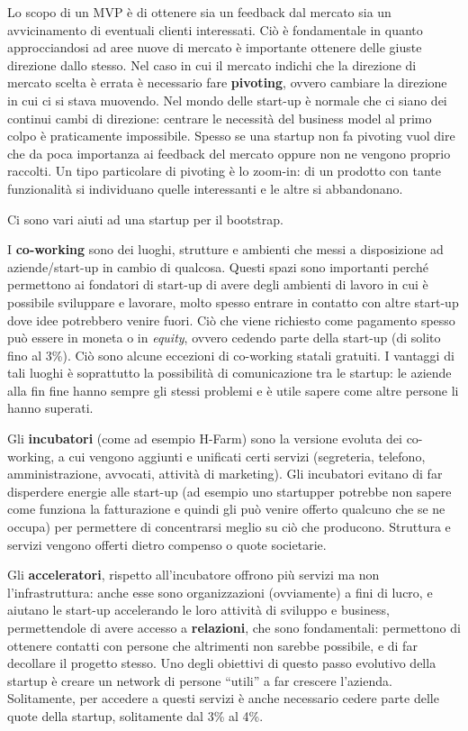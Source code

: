 \begin{enumerate}
 Lo scopo di un MVP è di ottenere sia un feedback dal mercato sia
 un avvicinamento di eventuali clienti interessati. Ciò è fondamentale in
 quanto approcciandosi ad aree nuove di mercato è importante ottenere delle
 giuste direzione dallo stesso. Nel caso in cui il mercato indichi che la
 direzione di mercato scelta è errata è necessario fare \textbf{pivoting},
 ovvero cambiare la direzione in cui ci si stava muovendo. Nel mondo delle
 start-up è normale che ci siano dei continui cambi di direzione: centrare le
 necessità del business model al primo colpo è praticamente impossibile. Spesso
 se una startup non fa pivoting vuol dire che da poca importanza ai feedback
 del mercato oppure non ne vengono proprio raccolti. Un tipo particolare di
 pivoting è lo zoom-in: di un prodotto con tante funzionalità si individuano
 quelle interessanti e le altre si abbandonano.

 Ci sono vari aiuti ad una startup per il bootstrap.

 I \textbf{co-working} sono dei luoghi, strutture e ambienti che messi a
 disposizione ad aziende/start-up in cambio di qualcosa.
 Questi spazi sono importanti perché permettono ai fondatori di start-up di
 avere degli ambienti di lavoro in cui è possibile sviluppare e lavorare, molto
 spesso entrare in contatto con altre start-up dove idee potrebbero venire
 fuori. Ciò che viene richiesto come pagamento spesso può essere in moneta o in
 \textit{equity}, ovvero cedendo parte della start-up (di solito fino al 3\%).
 Ciò sono alcune eccezioni di co-working statali gratuiti. I vantaggi di tali
 luoghi è soprattutto la possibilità di comunicazione tra le startup: le
 aziende alla fin fine hanno sempre gli stessi problemi e è utile sapere come
 altre persone li hanno superati.

 Gli \textbf{incubatori} (come ad esempio H-Farm) sono la versione evoluta dei
 co-working, a cui vengono aggiunti e unificati certi servizi (segreteria,
 telefono, amministrazione, avvocati, attività di marketing). Gli incubatori
 evitano di far disperdere energie alle start-up (ad esempio uno startupper
 potrebbe non sapere come funziona la fatturazione e quindi gli può venire
 offerto qualcuno che se ne occupa) per permettere di concentrarsi meglio su
 ciò che producono. Struttura e servizi vengono offerti dietro compenso o quote
 societarie.

 Gli \textbf{acceleratori}, rispetto all'incubatore offrono più servizi ma non
 l'infrastruttura: anche esse sono organizzazioni (ovviamente) a fini di lucro,
 e aiutano le start-up accelerando le loro attività di sviluppo e business,
 permettendole di avere accesso a \textbf{relazioni}, che sono fondamentali:
 permettono di ottenere contatti con persone che altrimenti non sarebbe
 possibile, e di far decollare il progetto stesso. Uno degli obiettivi di
 questo passo evolutivo della startup è creare un network di persone ``utili''
 a far crescere l'azienda. Solitamente, per accedere a questi servizi è anche
 necessario cedere parte delle quote della startup, solitamente dal 3\% al 4\%.


\end{enumerate}

